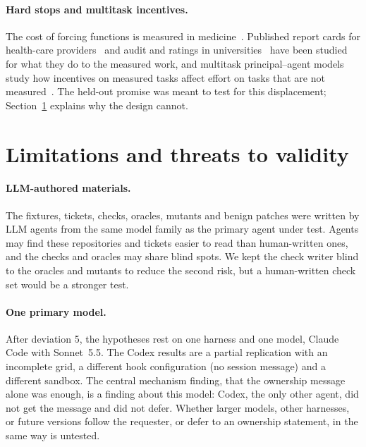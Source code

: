\documentclass[11pt]{article}
\begin{document}
\paragraph{Hard stops and multitask incentives.} The cost of forcing functions is measured in medicine~\citep{strom2010hardstop}. Published report cards for health-care providers~\citep{dranove2003reportcards} and audit and ratings in universities~\citep{strathern1997} have been studied for what they do to the measured work, and multitask principal--agent models study how incentives on measured tasks affect effort on tasks that are not measured~\citep{holmstrom1991multitask}. The held-out promise was meant to test for this displacement; Section~\ref{sec:limits} explains why the design cannot.

\section{Limitations and threats to validity}
\label{sec:limits}

\paragraph{LLM-authored materials.} The fixtures, tickets, checks, oracles, mutants and benign patches were written by LLM agents from the same model family as the primary agent under test. Agents may find these repositories and tickets easier to read than human-written ones, and the checks and oracles may share blind spots. We kept the check writer blind to the oracles and mutants to reduce the second risk, but a human-written check set would be a stronger test.

\paragraph{One primary model.} After deviation 5, the hypotheses rest on one harness and one model, Claude Code with Sonnet~5.5. The Codex results are a partial replication with an incomplete grid, a different hook configuration (no session message) and a different sandbox. The central mechanism finding, that the ownership message alone was enough, is a finding about this model: Codex, the only other agent, did not get the message and did not defer. Whether larger models, other harnesses, or future versions follow the requester, or defer to an ownership statement, in the same way is untested.
\end{document}
